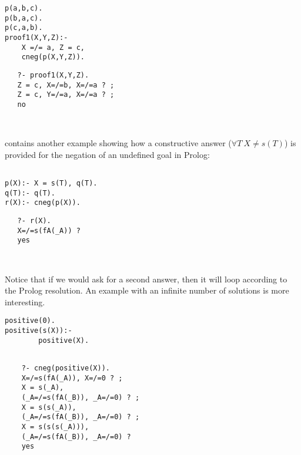 \documentclass{tlp}
\begin{document}
{\small
\begin{minipage}{2in}
\begin{verbatim}
p(a,b,c).
p(b,a,c).
p(c,a,b).
proof1(X,Y,Z):-
    X =/= a, Z = c,
    cneg(p(X,Y,Z)).

\end{verbatim}
\end{minipage}
\begin{minipage}{2in}
\begin{verbatim} 
   ?- proof1(X,Y,Z).
   Z = c, X=/=b, X=/=a ? ;
   Z = c, Y=/=a, X=/=a ? ;
   no
\end{verbatim} 
\end{minipage}\\
}
\cite{Stuckey95} contains another example showing how a constructive
answer ($\forall T ~ X \neq s(T)$) is provided for the negation of an
undefined goal in Prolog:

{\small
\begin{minipage}{2in}
\begin{verbatim}

p(X):- X = s(T), q(T).
q(T):- q(T).
r(X):- cneg(p(X)).
\end{verbatim}
\end{minipage}
\begin{minipage}{2in}
\begin{verbatim} 
   ?- r(X).
   X=/=s(fA(_A)) ?
   yes
\end{verbatim} 
\end{minipage}\\
}


Notice that if we would ask for a second answer, then it will loop
according to the Prolog resolution. An example with an infinite number
of solutions is more interesting.

{\small
\begin{minipage}{1.5in}
\begin{verbatim}
positive(0). 
positive(s(X)):-
        positive(X).  
\end{verbatim}
\end{minipage} 
\begin{minipage}{2.5in}
\begin{verbatim} 

    ?- cneg(positive(X)).
    X=/=s(fA(_A)), X=/=0 ? ;
    X = s(_A), 
    (_A=/=s(fA(_B)), _A=/=0) ? ;
    X = s(s(_A)), 
    (_A=/=s(fA(_B)), _A=/=0) ? ;
    X = s(s(s(_A))),
    (_A=/=s(fA(_B)), _A=/=0) ? 
    yes
\end{verbatim} 
\end{minipage}
}
\end{document}
